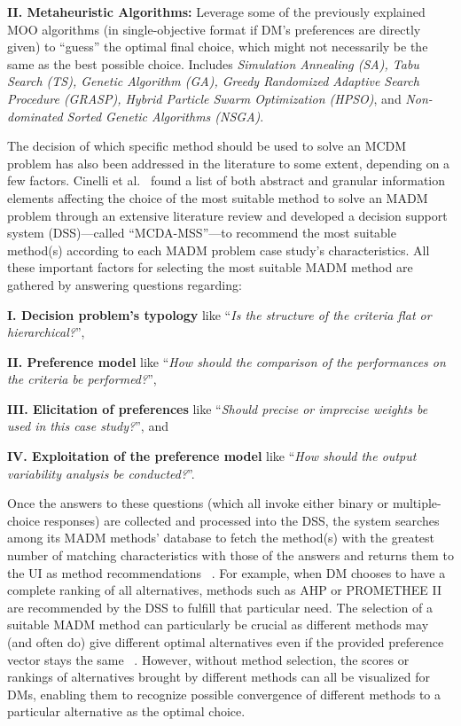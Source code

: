 \documentclass{sfuthesis}
\begin{document}
\textbf{II. Metaheuristic Algorithms:} Leverage some of the previously explained MOO algorithms (in single-objective format if DM’s preferences are directly given) to “guess” the optimal final choice, which might not necessarily be the same as the best possible choice. Includes \textit{Simulation Annealing (SA), Tabu Search (TS), Genetic Algorithm (GA), Greedy Randomized Adaptive Search Procedure (GRASP), Hybrid Particle Swarm Optimization (HPSO)}, and \textit{Non-dominated Sorted Genetic Algorithms (NSGA)}.\par
The decision of which specific method should be used to solve an MCDM problem has also been addressed in the literature to some extent, depending on a few factors. Cinelli et al.~\cite{cinelli2022recommending} found a list of both abstract and granular information elements affecting the choice of the most suitable method to solve an MADM problem through an extensive literature review and developed a decision support system (DSS)—called “MCDA-MSS”—to recommend the most suitable method(s) according to each MADM problem case study's characteristics. All these important factors for selecting the most suitable MADM method are gathered by answering questions regarding:\par
\textbf{I. Decision problem’s typology} like “\textit{Is the structure of the criteria flat or hierarchical?}”,\par
\textbf{II. Preference model} like “\textit{How should the comparison of the performances on the criteria be performed?}”,\par
\textbf{III. Elicitation of preferences} like “\textit{Should precise or imprecise weights be used in this case study?}”, and \par
\textbf{IV. Exploitation of the preference model} like “\textit{How should the output variability analysis be conducted?}”.\par
Once the answers to these questions (which all invoke either binary or multiple-choice responses) are collected and processed into the DSS, the system searches among its MADM methods’ database to fetch the method(s) with the greatest number of matching characteristics with those of the answers and returns them to the UI as method recommendations ~\cite{cinelli2022recommending}. For example, when DM chooses to have a complete ranking of all alternatives, methods such as AHP or PROMETHEE II are recommended by the DSS to fulfill that particular need. The selection of a suitable MADM method can particularly be crucial as different methods may (and often do) give different optimal alternatives even if the provided preference vector stays the same ~\cite{karami2014short,mulliner2016comparative}. However, without method selection, the scores or rankings of alternatives brought by different methods can all be visualized for DMs, enabling them to recognize possible convergence of different methods to a particular alternative as the optimal choice.\par
\end{document}
